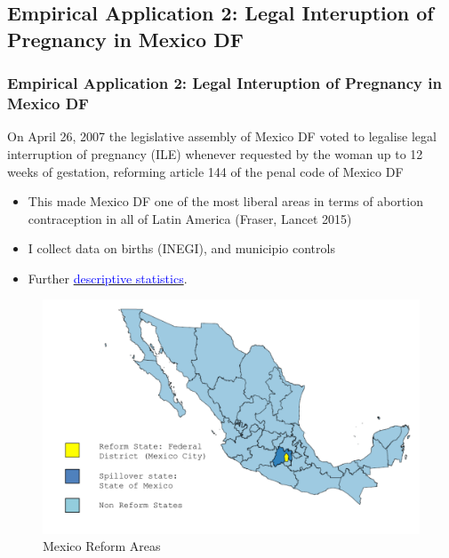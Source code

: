 \documentclass[10pt,letterpaper,subeqn]{beamer}
\begin{document}
\subsection{Empirical Application 2: Legal Interuption of Pregnancy in Mexico DF}
\begin{frame}[label=empirB]
  \frametitle{Empirical Application 2: Legal Interuption of Pregnancy in Mexico DF}
On April 26, 2007 the legislative assembly of Mexico DF voted to legalise legal 
interruption of pregnancy (ILE) whenever requested by the woman up to 12 weeks of 
gestation, reforming article 144 of the penal code of Mexico DF
\vspace{5mm}
\begin{itemize}
\item This made Mexico DF one of the most liberal areas in terms of abortion
contraception in all of Latin America (Fraser, Lancet 2015)
\item I collect data on births (INEGI), and municipio controls
\item Further \hyperlink{MexicoDesc}{\textcolor{blue}{descriptive statistics}}.
\end{itemize}

\end{frame}

\begin{frame}[label=empirB2]

\end{frame}


\begin{frame}[label=MexMap]
\begin{figure}
\begin{center}
\caption{Mexico Reform Areas}
\hspace{-16mm}\includegraphics[scale=0.32]{./figures/MexReform.png}
\end{center}
\end{figure}
\end{frame}
\end{document}
